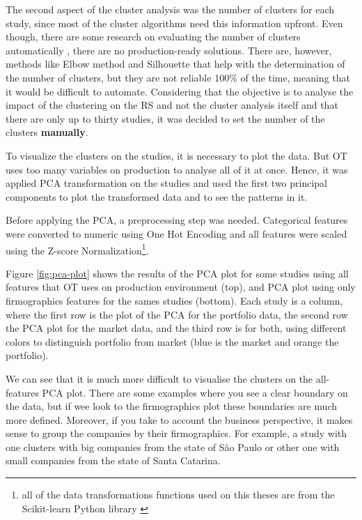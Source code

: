 The second aspect of the cluster analysis was the number of clusters for each study, since most of the cluster algorithms need this information upfront. Even though, there are some research on evaluating the number of clusters automatically \cite{yu2014automatic}, there are no production-ready solutions. There are, however, methods like Elbow method and Silhouette \cite{kodinariya2013review} that help with the determination of the number of clusters, but they are not reliable 100\% of the time, meaning that it would be difficult to automate. Considering that the objective is to analyse the impact of the clustering on the RS and not the cluster analysis itself and that there are only up to thirty studies, it was decided to set the number of the clusters \textbf{manually}.

To visualize the clusters on the studies, it is necessary to plot the data. But OT uses too many variables on production to analyse all of it at once. Hence, it was applied PCA transformation on the studies and used the first two principal components to plot the transformed data and to see the patterns in it. 

Before applying the PCA, a preprocessing step was needed. Categorical features were converted to numeric using One Hot Encoding and all features were scaled using the Z-score Normalization\footnote{all of the data transformations functions used on this theses are from the Scikit-learn Python library \cite{scikit-learn}}.

Figure \ref{fig:pca-plot} shows the results of the PCA plot for some studies using all features that OT uses on production environment (top), and PCA plot using only firmographics features for the sames studies (bottom). Each study is a column, where the first row is the plot of the PCA for the portfolio data, the second row the PCA plot for the market data, and the third row is for both, using different colors to distinguish portfolio from market (blue is the market and orange the portfolio).

We can see that it is much more difficult to visualise the clusters on the all-features PCA plot. There are some examples where you see a clear boundary on the data, but if wee look to the firmographics plot these boundaries are much more defined. Moreover, if you take to account the business perspective, it makes sense to group the companies by their firmographics. For example, a study with one clusters with big companies from the state of São Paulo or other one with small companies from the state of Santa Catarina.

